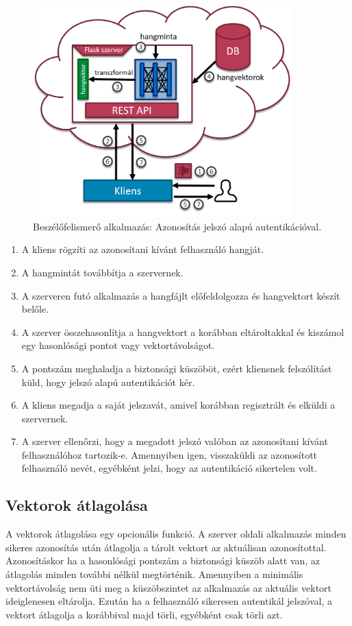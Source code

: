 \begin{figure}[H]
	\centering
	\includegraphics[width=100mm, keepaspectratio]{figures/app-with-security.png}
	\caption{Beszélőfelismerő alkalmazás: Azonosítás jelszó alapú autentikációval.}
	\label{fig:app-with-security}
\end{figure}
\newpage
\begin{enumerate}
	\item A kliens rögzíti az azonosítani kívánt felhasználó hangját.
	\item A hangmintát továbbítja a szervernek.
	\item A szerveren futó alkalmazás a hangfájlt előfeldolgozza és hangvektort készít belőle.
	\item A szerver összehasonlítja a hangvektort a korábban eltároltakkal és kiszámol egy hasonlósági pontot vagy vektortávolságot.
	\item A pontszám meghaladja a biztonsági küszöböt, ezért kliensnek felszólítást küld, hogy jelszó alapú autentikációt kér.
	\item A kliens megadja a saját jelszavát, amivel  korábban regisztrált és elküldi a szervernek.
	\item A szerver ellenőrzi, hogy a megadott jelszó valóban az azonosítani kívánt felhasználóhoz tartozik-e. Amennyiben igen, visszaküldi az azonosított felhasználó nevét,
	egyébként jelzi, hogy az autentikáció sikertelen volt.
\end{enumerate}

\subsection{Vektorok átlagolása}

A vektorok átlagolása egy opcionális funkció. A szerver oldali alkalmazás minden sikeres azonosítás után átlagolja a tárolt vektort az aktuálisan azonosítottal. Azonosításkor ha a hasonlósági pontszám
a biztonsági küszöb alatt van, az átlagolás minden további nélkül megtörténik.
Amennyiben a minimális vektortávolság nem üti meg a küszöbszintet az alkalmazás az aktuális vektort ideiglenesen eltárolja. Ezután ha a felhasználó sikeresen autentikál jelszóval, a vektort átlagolja a korábbival majd törli, egyébként csak törli azt.



